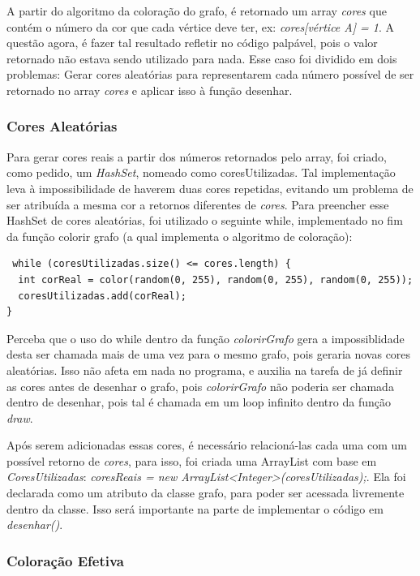 \documentclass[
	12pt,				%
	oneside,			%
	a4paper,			%
	english,			%
	brazil,				%
	]{abntex2}
\begin{document}
{A partir do algoritmo da coloração do grafo, é retornado um array \textit{cores} que contém o número da cor que cada vértice deve ter, ex: \textit{cores[vértice A] = 1}. A questão agora, é fazer tal resultado refletir no código palpável, pois o valor retornado não estava sendo utilizado para nada. Esse caso foi dividido em dois problemas: Gerar cores aleatórias para representarem cada número possível de ser retornado no array \textit{cores} e aplicar isso à função desenhar.

\subsubsection{Cores Aleatórias}
Para gerar cores reais a partir dos números retornados pelo array, foi criado, como pedido, um \textit{HashSet}, nomeado como coresUtilizadas. Tal implementação leva à impossibilidade de haverem duas cores repetidas, evitando um problema de ser atribuída a mesma cor a retornos diferentes de \textit{cores}. Para preencher esse HashSet de cores aleatórias, foi utilizado o seguinte while, implementado no fim da função colorir grafo (a qual implementa o algoritmo de coloração):

\begin{verbatim}
 while (coresUtilizadas.size() <= cores.length) {
  int corReal = color(random(0, 255), random(0, 255), random(0, 255));
  coresUtilizadas.add(corReal);
}
\end{verbatim}

Perceba que o uso do while dentro da função \textit{colorirGrafo} gera a impossiblidade desta ser chamada mais de uma vez para o mesmo grafo, pois geraria novas cores aleatórias. Isso não afeta em nada no programa, e auxilia na tarefa de já definir as cores antes de desenhar o grafo, pois \textit{colorirGrafo} não poderia ser chamada dentro de desenhar, pois tal é chamada em um loop infinito dentro da função \textit{draw}. 

Após serem adicionadas essas cores, é necessário relacioná-las cada uma com um possível retorno de \textit{cores}, para isso, foi criada uma ArrayList com base em \textit{CoresUtilizadas}: \textit{coresReais = new ArrayList<Integer>(coresUtilizadas);}. Ela foi declarada como um atributo da classe grafo, para poder ser acessada livremente dentro da classe. Isso será importante na parte de implementar o código em \textit{desenhar()}.

\subsubsection{Coloração Efetiva}

}
\end{document}
